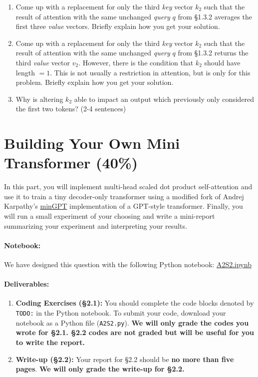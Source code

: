 \documentclass{article}
\begin{document}
\begin{enumerate}
    \item Come up with a replacement for only the third \textit{key} vector
    $k_2$ such that the result of attention with the same unchanged
    \textit{query} $q$ from \S 1.3.2 averages the first three \textit{value}
    vectors. Briefly explain how you get your solution.

    \item Come up with a replacement for only the third \textit{key} vector
    $k_2$ such that the result of attention with the same unchanged
    \textit{query} $q$ from \S 1.3.2 returns the third \textit{value} vector
    $v_2$. However, there is the condition that $k_2$ should have length $=1$.
    This is not usually a restriction in attention, but is only for this
    problem. Briefly explain how you get your solution.

    \item Why is altering $k_2$ able to impact an output which previously only
    considered the first two tokens? (2-4 sentences)
\end{enumerate}

\newpage

\section{Building Your Own Mini Transformer (40\%)}

In this part, you will implement multi-head scaled dot product self-attention
and use it to train a tiny decoder-only transformer using a modified fork of
Andrej Karpathy's \href{https://github.com/karpathy/minGPT}{minGPT}
implementation of a GPT-style transformer. Finally, you will run a small
experiment of your choosing and write a mini-report summarizing your experiment
and interpreting your results.

\paragraph{Notebook:}
We have designed this question with the following Python notebook:
\textcolor{blue}{\href{https://colab.research.google.com/drive/1slSlIuxm6qYiHQH5PrcbpmzHvHuW5vF5?usp=sharing}{A2S2.ipynb}}


\paragraph{Deliverables:} 

\begin{enumerate}
\item \textbf{Coding Exercises (\S 2.1):} You should complete the code blocks
denoted by \texttt{TODO:} in the Python notebook. To submit your code, download
your notebook as a Python file (\verb|A2S2.py|). \textbf{We will only grade the
codes you wrote for \S 2.1. \S 2.2 codes are not graded but will be useful for
you to write the report.}
\item \textbf{Write-up (\S 2.2):} Your report for \S 2.2 should be \textbf{no
more than five pages}. \textbf{We will only grade the write-up for \S 2.2.}
\end{enumerate}
\end{document}
